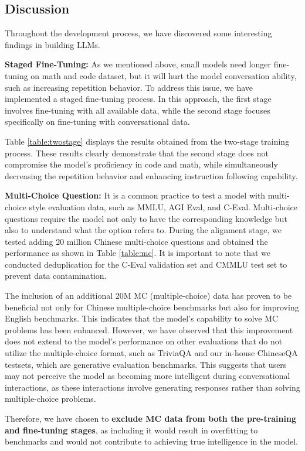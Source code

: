 \subsection{Discussion}

Throughout the development process, we have discovered some interesting findings in building LLMs. 

\textbf{Staged Fine-Tuning:} As we mentioned above, small models need longer fine-tuning on math and code dataset, but it will hurt the model conversation ability, such as increasing repetition behavior. To address this issue, we have implemented a staged fine-tuning process. In this approach, the first stage involves fine-tuning with all available data, while the second stage focuses specifically on fine-tuning with conversational data.

Table \ref{table:twostage} displays the results obtained from the two-stage training process. These results clearly demonstrate that the second stage does not compromise the model's proficiency in code and math, while simultaneously decreasing the repetition behavior and enhancing instruction following capability.

\textbf{Multi-Choice Question:} It is a common practice to test a model with multi-choice style evaluation data, such as MMLU, AGI Eval, and C-Eval. Multi-choice questions require the model not only to have the corresponding knowledge but also to understand what the option refers to.  During the alignment stage, we tested adding 20 million  Chinese multi-choice questions and obtained the performance as shown in Table \ref{table:mc}. It is important to note that we conducted deduplication for the C-Eval validation set and CMMLU test set to prevent data contamination. 

The inclusion of an additional 20M MC (multiple-choice) data has proven to be beneficial not only for Chinese multiple-choice benchmarks but also for improving English benchmarks. This indicates that the model's capability to solve MC problems has been enhanced. However, we have observed that this improvement does not extend to the model's performance on other evaluations that do not utilize the multiple-choice format, such as TriviaQA and our in-house ChineseQA testsets, which are generative evaluation benchmarks. This suggests that users may not perceive the model as becoming more intelligent during conversational interactions, as these interactions involve generating responses rather than solving multiple-choice problems.

Therefore, we have chosen to \textbf{exclude MC data from both the pre-training and fine-tuning stages}, as including it would result in overfitting to benchmarks and would not contribute to achieving true intelligence in the model.

